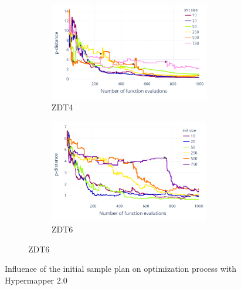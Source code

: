 \begin{figure}[!h]
        
        \begin{subfigure}{\textwidth}
            \begin{subfigure}{0.45\textwidth}
                \includegraphics[width=\textwidth]{content/images/hypermapper_zdt4_start_set}
                \caption{ZDT4}
                \label{fig:hmapper_zdt4_start_set}
            \end{subfigure}
            \begin{subfigure}{0.45\textwidth}
                \includegraphics[width=\textwidth]{content/images/hypermapper_zdt6_start_set}
                \caption{ZDT6}
                \label{fig:hmapper_zdt6_start_set}
            \end{subfigure}
        \end{subfigure} 

        \caption[Influence of the initial sample plan on optimization process with Hypermapper 2.0]{Influence of the initial sample plan on optimization process with Hypermapper 2.0}
        \label{fig:hmapper_start_set}    
    \end{figure}
    
